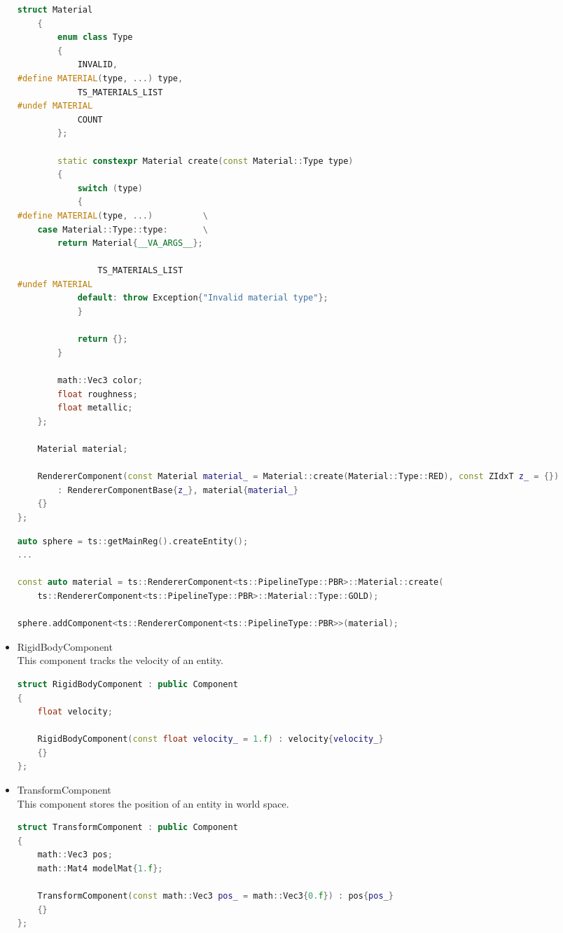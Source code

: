 \begin{itemize}
\begin{lstlisting}[language=c++, caption=Renderer PBR component struct (./engine/include/tsengine/ecs/components/renderer\_component.h)]
    struct Material
    {
        enum class Type
        {
            INVALID,
#define MATERIAL(type, ...) type, 
            TS_MATERIALS_LIST
#undef MATERIAL
            COUNT
        };

        static constexpr Material create(const Material::Type type)
        {
            switch (type)
            {
#define MATERIAL(type, ...)          \
    case Material::Type::type:       \
        return Material{__VA_ARGS__};

                TS_MATERIALS_LIST
#undef MATERIAL
            default: throw Exception{"Invalid material type"};
            }

            return {};
        }

        math::Vec3 color;
        float roughness;
        float metallic;
    };

    Material material;

    RendererComponent(const Material material_ = Material::create(Material::Type::RED), const ZIdxT z_ = {})
        : RendererComponentBase{z_}, material{material_}
    {}
};
\end{lstlisting}

\begin{lstlisting}[language=c++, caption=Process of adding PBR Renderer Component with material (./game/game.cpp)]
auto sphere = ts::getMainReg().createEntity();
...

const auto material = ts::RendererComponent<ts::PipelineType::PBR>::Material::create(
    ts::RendererComponent<ts::PipelineType::PBR>::Material::Type::GOLD);

sphere.addComponent<ts::RendererComponent<ts::PipelineType::PBR>>(material);
\end{lstlisting}
    \item RigidBodyComponent\\
    \label{rigidbody_component}
    This component tracks the velocity of an entity.
\begin{lstlisting}[language=c++, caption=\texttt{RigidBody} component (./engine/include/tsengine/ecs/components/rigidbody\_component.h)]
struct RigidBodyComponent : public Component
{
    float velocity;

    RigidBodyComponent(const float velocity_ = 1.f) : velocity{velocity_}
    {}
};
\end{lstlisting}
    \item TransformComponent\\
    \label{transform_component}
    This component stores the position of an entity in world space.
\begin{lstlisting}[language=c++, caption=\texttt{TrasnformComponent} component (./engine/include/tsengine/ecs/components/transform\_component.h)]
struct TransformComponent : public Component
{
    math::Vec3 pos;
    math::Mat4 modelMat{1.f};

    TransformComponent(const math::Vec3 pos_ = math::Vec3{0.f}) : pos{pos_}
    {}
};
\end{lstlisting}
\end{itemize}

